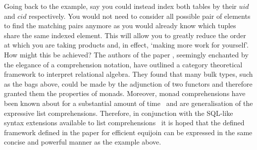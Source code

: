 Going back to the example, say you could instead index both tables by their
$uid$ and $cid$ respectively. You would not need to consider all possible pair
of elements to find the matching pairs anymore as you would already know which
tuples share the same indexed element. This will allow you to greatly reduce the
order at which you are taking products and, in effect, `making more work for
yourself'. How might this be achieved? The authors of the paper \relalg{},
seemingly enchanted by the elegance of a comprehension notation, have outlined a
category theoretical framework to interpret relational algebra. They found that
many bulk types, such as the bags above, could be made by the adjunction of two
functors and therefore granted them the properties of monads. Moreover, monad
comprehensions have been known about for a substantial amount of
time~\cite{MonadComprehensions} and are generalisation of the expressive list
comprehensions. Therefore, in conjunction with the SQL-like syntax extensions
available to list comprehensions~\cite{ComprehensiveComprehensions} it is hoped
that the defined framework defined in the paper for efficient equijoin can be
expressed in the same concise and powerful manner as the example above.
